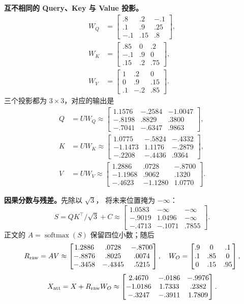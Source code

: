 \textbf{互不相同的 Query、Key 与 Value 投影。}
\[
\begin{aligned}
W_Q&=\begin{bmatrix}.8&.2&-.1\\.1&.9&.25\\-.1&.15&.8\end{bmatrix},\\[3pt]
W_K&=\begin{bmatrix}.85&0&.2\\-.1&.9&0\\.15&.2&.75\end{bmatrix},\\[3pt]
W_V&=\begin{bmatrix}1&.2&0\\0&.9&.15\\.1&-.2&.85\end{bmatrix}.
\end{aligned}
\]
三个投影都为 $3\times3$，对应的输出是
\[
\begin{aligned}
Q&=UW_Q\approx
\begin{bmatrix}
1.1576&-.2584&-1.0047\\
-.8198&.8829&.3800\\
-.7041&-.6347&.9863
\end{bmatrix},\\[4pt]
K&=UW_K\approx
\begin{bmatrix}
1.0775&-.5824&-.4332\\
-1.1473&1.1176&-.2879\\
-.2208&-.4436&.9364
\end{bmatrix},\\[4pt]
V&=UW_V\approx
\begin{bmatrix}
1.2886&.0728&-.8700\\
-1.1968&.9062&.1320\\
-.4623&-1.1280&1.0770
\end{bmatrix}.
\end{aligned}
\]

\textbf{因果分数与残差。}先除以 $\sqrt3$，
将未来位置掩为 $-\infty$：
\[
S=QK^\top/\sqrt3+C\approx
\begin{bmatrix}
1.0583&-\infty&-\infty\\
-.9019&1.0496&-\infty\\
-.4713&-.1071&.7855
\end{bmatrix}.
\]
正文的 $A=\operatorname{softmax}(S)$
保留四位小数；随后
\[
R_{\rm raw}=AV\approx
\begin{bmatrix}
1.2886&.0728&-.8700\\
-.8876&.8025&.0074\\
-.3458&-.4345&.5215
\end{bmatrix},
\quad
W_O=\begin{bmatrix}
.9&0&.1\\.1&.85&0\\0&.15&.95
\end{bmatrix},
\]
\[
X_{\rm att}=X+R_{\rm raw}W_O\approx
\begin{bmatrix}
2.4670&-.0186&-.9976\\
-1.0186&1.7333&.2382\\
-.3247&-.3911&1.7809
\end{bmatrix}.
\]


